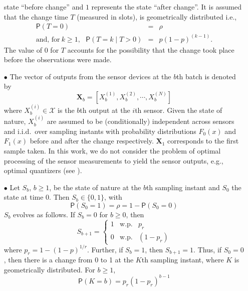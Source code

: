 \documentclass[acmtosn]{acmtrans2m}
\newcommand{\prob}[1]{\mathsf{P}\left(#1\right)}
\begin{document}
\begin{itemize}
  state {\sf ``before change''} and $1$ represents the state {\sf ``after change''}. 
  It is assumed that 
  the change time $T$ (measured in slots),
  is geometrically distributed i.e.,
  \begin{eqnarray}
  \label{eqn:distribution_of_T}
  \prob{T=0} & = & \rho \nonumber \\
  \text{and, for} \  k\geqslant 1, \ \ \ \prob{T=k\mid T>0} & = & p(1-p)^{(k-1)}.
  \end{eqnarray} 
  The value of $0$ for $T$ accounts for the possibility that the change took 
  place before the observations were made.
\item[$\bullet$] The vector of outputs from the sensor devices at the $b$th
  batch is denoted by
  \[\mathbf{X}_b =\left[X^{(1)}_b,X^{(2)}_b, \cdots, X^{(N)}_b\right]\]
  where $X^{(i)}_b \in \mathcal{X}$ is the $b$th output at the $i$th sensor. 
  Given the state of nature, $X^{(i)}_b$ are assumed to be (conditionally) 
  independent across sensors and i.i.d.\ over sampling instants 
  with probability distributions $F_0(x)$ and $F_1(x)$ before and
  after the change respectively. $\mathbf{X}_1$ corresponds to the
  first sample taken.  In this work, we do not consider the problem of
  optimal processing of the sensor measurements to yield the sensor
  outputs, e.g., optimal quantizers (see \cite{veeravalli01decentralized-quickest}).


\item[$\bullet$] Let ${S}_b$, $b\geqslant 1$, be the state of nature at the $b$th 
  sampling instant and
  $S_0$ the state at time $0$. Then ${S}_b \in \{0,1\}$, with
  \[\prob{S_0=1} = \rho= 1 -\prob{S_0=0}\]
  ${S}_b$ evolves as follows. 
  If ${S}_b=0$ for $b \geqslant 0$, then
  \[S_{b+1} =\left\{\begin{array}{ccc} 1&\mbox{w.p.}&p_r\\0&\mbox{w.p.}&(1-p_r)
  \end{array}\right.\]
  where $p_r = 1-(1-p)^{1/r}$.
  Further, if ${S}_b = 1$, then ${S}_{b+1}=1$. Thus, if ${S}_0 = 0$, then there
  is a change from 0 to 1 at the $K$th sampling instant, where $K$  is geometrically
  distributed. For $b\geqslant 1$,
  \[\prob{K=b} = p_r(1-p_r)^{b-1}\]
\end{itemize}
\end{document}

